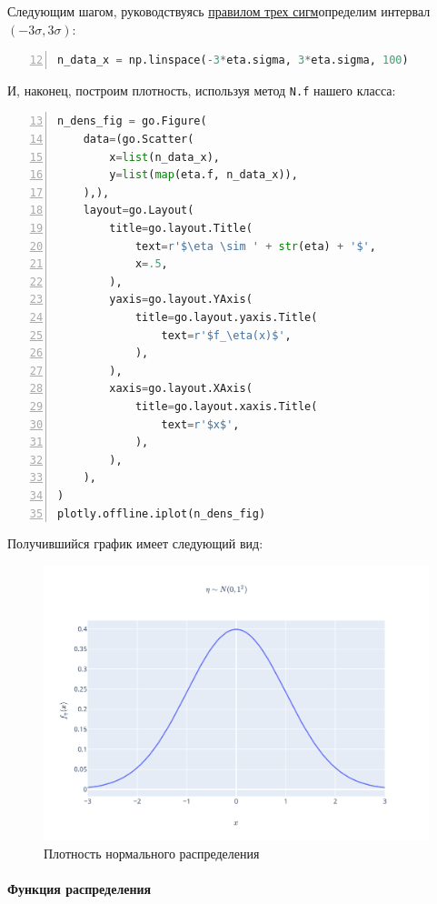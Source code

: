 \documentclass[
  russian,
  a4paper,
]{article}
\newcommand{\passthrough}[1]{#1}
\let\oldparagraph\paragraph
\renewcommand{\paragraph}[1]{\oldparagraph{#1}\mbox{}}
\begin{document}
Следующим шагом, руководствуясь
\href{https://ru.wikipedia.org/wiki/Среднеквадратическое_отклонение\#Правило_трёх_сигм}{правилом
трех сигм}определим интервал \((-3\sigma, 3\sigma)\):

\begin{lstlisting}[language=Python, numbers=left, firstnumber=12]
n_data_x = np.linspace(-3*eta.sigma, 3*eta.sigma, 100)
\end{lstlisting}

И, наконец, построим плотность, используя метод
\passthrough{\lstinline!N.f!} нашего класса:

\begin{lstlisting}[language=Python, numbers=left, firstnumber=13]
n_dens_fig = go.Figure(
    data=(go.Scatter(
        x=list(n_data_x),
        y=list(map(eta.f, n_data_x)),
    ),),
    layout=go.Layout(
        title=go.layout.Title(
            text=r'$\eta \sim ' + str(eta) + '$',
            x=.5,
        ),
        yaxis=go.layout.YAxis(
            title=go.layout.yaxis.Title(
                text=r'$f_\eta(x)$',
            ),
        ),
        xaxis=go.layout.XAxis(
            title=go.layout.xaxis.Title(
                text=r'$x$',
            ),
        ),
    ),
)
plotly.offline.iplot(n_dens_fig)
\end{lstlisting}

Получившийся график имеет следующий вид:

\begin{figure}
\centering
\includegraphics{../assets/n_density.svg}
\caption{Плотность нормального распределения}
\end{figure}

\hypertarget{ux444ux443ux43dux43aux446ux438ux44f-ux440ux430ux441ux43fux440ux435ux434ux435ux43bux435ux43dux438ux44f-1}{%
\paragraph{Функция
распределения}\label{ux444ux443ux43dux43aux446ux438ux44f-ux440ux430ux441ux43fux440ux435ux434ux435ux43bux435ux43dux438ux44f-1}}
\end{document}
